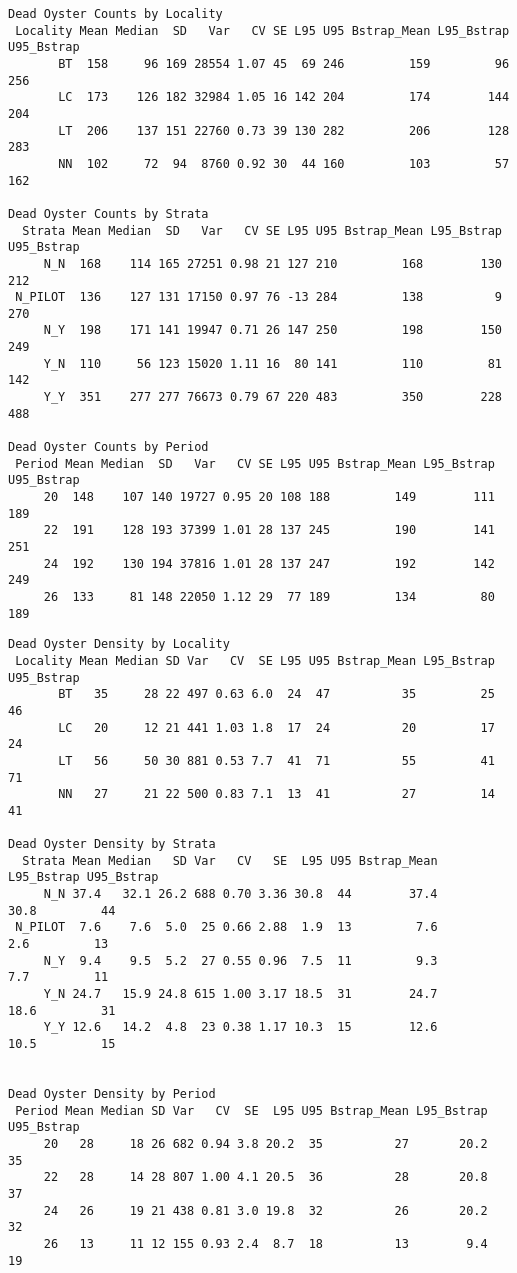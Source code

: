\documentclass[
]{article}
\begin{document}
\begin{verbatim}
Dead Oyster Counts by Locality
 Locality Mean Median  SD   Var   CV SE L95 U95 Bstrap_Mean L95_Bstrap U95_Bstrap
       BT  158     96 169 28554 1.07 45  69 246         159         96        256
       LC  173    126 182 32984 1.05 16 142 204         174        144        204
       LT  206    137 151 22760 0.73 39 130 282         206        128        283
       NN  102     72  94  8760 0.92 30  44 160         103         57        162

Dead Oyster Counts by Strata
  Strata Mean Median  SD   Var   CV SE L95 U95 Bstrap_Mean L95_Bstrap U95_Bstrap
     N_N  168    114 165 27251 0.98 21 127 210         168        130        212
 N_PILOT  136    127 131 17150 0.97 76 -13 284         138          9        270
     N_Y  198    171 141 19947 0.71 26 147 250         198        150        249
     Y_N  110     56 123 15020 1.11 16  80 141         110         81        142
     Y_Y  351    277 277 76673 0.79 67 220 483         350        228        488

Dead Oyster Counts by Period
 Period Mean Median  SD   Var   CV SE L95 U95 Bstrap_Mean L95_Bstrap U95_Bstrap
     20  148    107 140 19727 0.95 20 108 188         149        111        189
     22  191    128 193 37399 1.01 28 137 245         190        141        251
     24  192    130 194 37816 1.01 28 137 247         192        142        249
     26  133     81 148 22050 1.12 29  77 189         134         80        189
\end{verbatim}

\begin{verbatim}
Dead Oyster Density by Locality
 Locality Mean Median SD Var   CV  SE L95 U95 Bstrap_Mean L95_Bstrap U95_Bstrap
       BT   35     28 22 497 0.63 6.0  24  47          35         25         46
       LC   20     12 21 441 1.03 1.8  17  24          20         17         24
       LT   56     50 30 881 0.53 7.7  41  71          55         41         71
       NN   27     21 22 500 0.83 7.1  13  41          27         14         41

Dead Oyster Density by Strata
  Strata Mean Median   SD Var   CV   SE  L95 U95 Bstrap_Mean L95_Bstrap U95_Bstrap
     N_N 37.4   32.1 26.2 688 0.70 3.36 30.8  44        37.4       30.8         44
 N_PILOT  7.6    7.6  5.0  25 0.66 2.88  1.9  13         7.6        2.6         13
     N_Y  9.4    9.5  5.2  27 0.55 0.96  7.5  11         9.3        7.7         11
     Y_N 24.7   15.9 24.8 615 1.00 3.17 18.5  31        24.7       18.6         31
     Y_Y 12.6   14.2  4.8  23 0.38 1.17 10.3  15        12.6       10.5         15


Dead Oyster Density by Period
 Period Mean Median SD Var   CV  SE  L95 U95 Bstrap_Mean L95_Bstrap U95_Bstrap
     20   28     18 26 682 0.94 3.8 20.2  35          27       20.2         35
     22   28     14 28 807 1.00 4.1 20.5  36          28       20.8         37
     24   26     19 21 438 0.81 3.0 19.8  32          26       20.2         32
     26   13     11 12 155 0.93 2.4  8.7  18          13        9.4         19
\end{verbatim}
\end{document}
